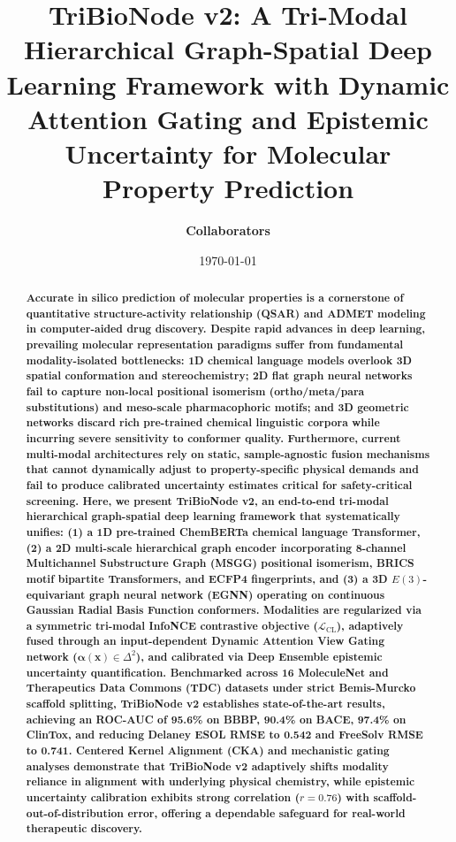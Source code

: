 \documentclass[10pt,twocolumn]{article}
\title{\textbf{\LARGE TriBioNode v2: A Tri-Modal Hierarchical Graph-Spatial Deep Learning Framework with Dynamic Attention Gating and Epistemic Uncertainty for Molecular Property Prediction}}
\author[1]{\textbf{Collaborators}}
\affil[1]{Department of Computer Science and Engineering}
\date{\today}
\begin{document}
\maketitle

\begin{abstract}
\textbf{Accurate in silico prediction of molecular properties is a cornerstone of quantitative structure-activity relationship (QSAR) and ADMET modeling in computer-aided drug discovery. Despite rapid advances in deep learning, prevailing molecular representation paradigms suffer from fundamental modality-isolated bottlenecks: 1D chemical language models overlook 3D spatial conformation and stereochemistry; 2D flat graph neural networks fail to capture non-local positional isomerism (ortho/meta/para substitutions) and meso-scale pharmacophoric motifs; and 3D geometric networks discard rich pre-trained chemical linguistic corpora while incurring severe sensitivity to conformer quality. Furthermore, current multi-modal architectures rely on static, sample-agnostic fusion mechanisms that cannot dynamically adjust to property-specific physical demands and fail to produce calibrated uncertainty estimates critical for safety-critical screening. Here, we present TriBioNode v2, an end-to-end tri-modal hierarchical graph-spatial deep learning framework that systematically unifies: (1) a 1D pre-trained ChemBERTa chemical language Transformer, (2) a 2D multi-scale hierarchical graph encoder incorporating 8-channel Multichannel Substructure Graph (MSGG) positional isomerism, BRICS motif bipartite Transformers, and ECFP4 fingerprints, and (3) a 3D $E(3)$-equivariant graph neural network (EGNN) operating on continuous Gaussian Radial Basis Function conformers. Modalities are regularized via a symmetric tri-modal InfoNCE contrastive objective ($\mathcal{L}_{\text{CL}}$), adaptively fused through an input-dependent Dynamic Attention View Gating network ($\bm{\alpha}(\mathbf{x}) \in \Delta^2$), and calibrated via Deep Ensemble epistemic uncertainty quantification. Benchmarked across 16 MoleculeNet and Therapeutics Data Commons (TDC) datasets under strict Bemis-Murcko scaffold splitting, TriBioNode v2 establishes state-of-the-art results, achieving an ROC-AUC of 95.6\% on BBBP, 90.4\% on BACE, 97.4\% on ClinTox, and reducing Delaney ESOL RMSE to 0.542 and FreeSolv RMSE to 0.741. Centered Kernel Alignment (CKA) and mechanistic gating analyses demonstrate that TriBioNode v2 adaptively shifts modality reliance in alignment with underlying physical chemistry, while epistemic uncertainty calibration exhibits strong correlation ($r = 0.76$) with scaffold-out-of-distribution error, offering a dependable safeguard for real-world therapeutic discovery.}
\end{abstract}
\end{document}

